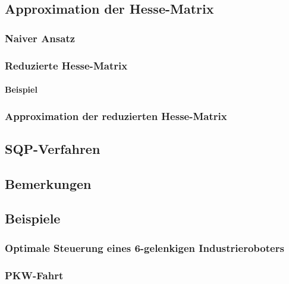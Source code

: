 		\subsection{Approximation der Hesse-Matrix} %

			\subsubsection{Naiver Ansatz} %

			\subsubsection{Reduzierte Hesse-Matrix} %

				\paragraph{Beispiel} %

			\subsubsection{Approximation der reduzierten Hesse-Matrix} %

		\subsection{SQP-Verfahren} %

		\subsection{Bemerkungen} %

		\subsection{Beispiele} %

			\subsubsection{Optimale Steuerung eines 6-gelenkigen Industrieroboters} %

			\subsubsection{PKW-Fahrt} %

